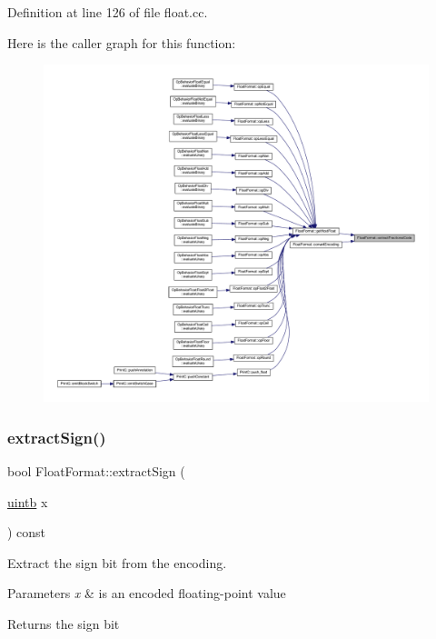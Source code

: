 Definition at line 126 of file float.\+cc.

Here is the caller graph for this function\+:
\nopagebreak
\begin{figure}[H]
\begin{center}
\leavevmode
\includegraphics[width=350pt]{class_float_format_af06109651ce301156e5a384c946e7780_icgraph}
\end{center}
\end{figure}
\mbox{\label{class_float_format_afa7d38ddb73a8cd9f4d29b839af04d1d}} 
\subsubsection{\texorpdfstring{extractSign()}{extractSign()}}
{\footnotesize\ttfamily bool Float\+Format\+::extract\+Sign (\begin{DoxyParamCaption}\item[{\mbox{\hyperlink{types_8h_a2db313c5d32a12b01d26ac9b3bca178f}{uintb}}}]{x }\end{DoxyParamCaption}) const}



Extract the sign bit from the encoding. 


\begin{DoxyParams}{Parameters}
{\em x} & is an encoded floating-\/point value \\
\hline
\end{DoxyParams}
\begin{DoxyReturn}{Returns}
the sign bit 
\end{DoxyReturn}


